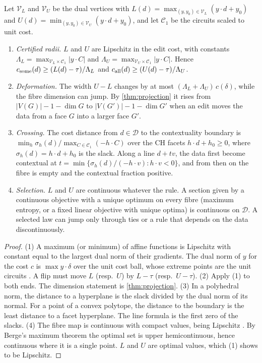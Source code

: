 \documentclass[11pt]{article}
\theoremstyle{definition}\newtheorem{definition}[theorem]{Definition}\newtheorem{remark}[theorem]{Remark}\newtheorem{example}[theorem]{Example}\newtheorem{problem}[theorem]{Open problem}\crefname{problem}{Problem}{Problems}
\begin{document}
\begin{proposition}\label{prop:radii}
Let $\mathcal V_L$ and $\mathcal V_U$ be the dual vertices with $L(d)=\max_{(y,y_0)\in\mathcal V_L}(y\cdot d+y_0)$ and $U(d)=\min_{(y,y_0)\in\mathcal V_U}(y\cdot d+y_0)$, and let $\mathcal C_1$ be the circuits scaled to unit cost.
\begin{enumerate}
\item[(1)] \emph{Certified radii.} $L$ and $U$ are Lipschitz in the edit cost, with constants $\Lambda_L=\max_{\mathcal V_L\times\mathcal C_1}|y\cdot C|$ and $\Lambda_U=\max_{\mathcal V_U\times\mathcal C_1}|y\cdot C|$. Hence $c_{\rm some}(d)\ge(L(d)-\tau)/\Lambda_L$ and $c_{\rm all}(d)\ge(U(d)-\tau)/\Lambda_U$.
\item[(2)] \emph{Deformation.} The width $U-L$ changes by at most $(\Lambda_L+\Lambda_U)\,c(\delta)$, while the fibre dimension can jump. By \cref{thm:projection} it rises from $|V(G)|-1-\dim G$ to $|V(G')|-1-\dim G'$ when an edit moves the data from a face $G$ into a larger face $G'$.
\item[(3)] \emph{Crossing.} The cost distance from $d\in\mathcal D$ to the contextuality boundary is $\min_h \sigma_h(d)/\max_{C\in\mathcal C_1}(-h\cdot C)$ over the CH facets $h\cdot d+h_0\ge0$, where $\sigma_h(d)=h\cdot d+h_0$ is the slack. Along a line $d+tv$, the data first become contextual at $t=\min\{\sigma_h(d)/(-h\cdot v):h\cdot v<0\}$, and from then on the fibre is empty and the contextual fraction positive.
\item[(4)] \emph{Selection.} $L$ and $U$ are continuous whatever the rule. A section given by a continuous objective with a unique optimum on every fibre (maximum entropy, or a fixed linear objective with unique optima) is continuous on $\mathcal D$. A selected law can jump only through ties or a rule that depends on the data discontinuously.
\end{enumerate}
\end{proposition}

\begin{proof}
(1) A maximum (or minimum) of affine functions is Lipschitz with constant equal to the largest dual norm of their gradients. The dual norm of $y$ for the cost $c$ is $\max y\cdot\delta$ over the unit cost ball, whose extreme points are the unit circuits \cite{Rockafellar1969}. A flip must move $L$ (resp.\ $U$) by $L-\tau$ (resp.\ $U-\tau$). (2) Apply (1) to both ends. The dimension statement is \cref{thm:projection}. (3) In a polyhedral norm, the distance to a hyperplane is the slack divided by the dual norm of its normal. For a point of a convex polytope, the distance to the boundary is the least distance to a facet hyperplane. The line formula is the first zero of the slacks. (4) The fibre map is continuous with compact values, being Lipschitz \cite{WalkupWets1969}. By Berge's maximum theorem the optimal set is upper hemicontinuous, hence continuous where it is a single point. $L$ and $U$ are optimal values, which (1) shows to be Lipschitz.
\end{proof}
\end{document}
